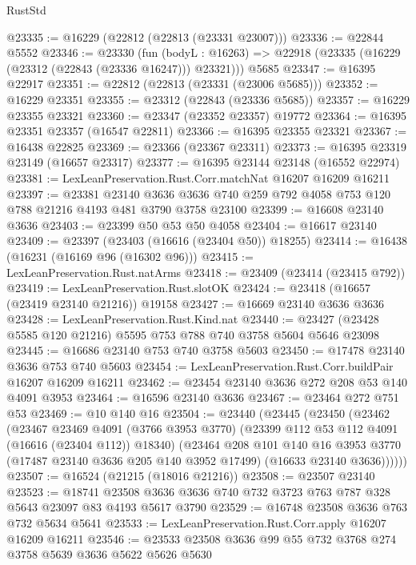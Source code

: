 \begin{lexlean}{RustStd}
\begin{coremodule}
@23335 := @16229 (@22812 (@22813 (@23331 @23007)))
@23336 := @22844 @5552
@23346 := @23330
    (fun (bodyL : @16263) => @22918 (@23335 (@16229 (@23312 (@22843 (@23336 @16247))) @23321)))
    @5685
@23347 := @16395 @22917
@23351 := @22812 (@22813 (@23331 (@23006 @5685)))
@23352 := @16229 @23351
@23355 := @23312 (@22843 (@23336 @5685))
@23357 := @16229 @23355 @23321
@23360 := @23347 (@23352 @23357) @19772
@23364 := @16395 @23351 @23357 (@16547 @22811)
@23366 := @16395 @23355 @23321
@23367 := @16438 @22825
@23369 := @23366 (@23367 @23311)
@23373 := @16395 @23319 @23149 (@16657 @23317)
@23377 := @16395 @23144 @23148 (@16552 @22974)
@23381 := LexLeanPreservation.Rust.Corr.matchNat @16207 @16209 @16211
@23397 := @23381
    @23140
    @3636
    @3636
    @740
    @259
    @792
    @4058
    @753
    @120
    @788
    @21216
    @4193
    @481
    @3790
    @3758
    @23100
@23399 := @16608 @23140 @3636
@23403 := @23399 @50 @53 @50 @4058
@23404 := @16617 @23140
@23409 := @23397 (@23403 (@16616 (@23404 @50)) @18255)
@23414 := @16438 (@16231 (@16169 @96 (@16302 @96)))
@23415 := LexLeanPreservation.Rust.natArms
@23418 := @23409 (@23414 (@23415 @792))
@23419 := LexLeanPreservation.Rust.slotOK
@23424 := @23418 (@16657 (@23419 @23140 @21216)) @19158
@23427 := @16669 @23140 @3636 @3636
@23428 := LexLeanPreservation.Rust.Kind.nat
@23440 := @23427 (@23428 @5585 @120 @21216) @5595 @753 @788 @740 @3758 @5604 @5646 @23098
@23445 := @16686 @23140 @753 @740 @3758 @5603
@23450 := @17478 @23140 @3636 @753 @740 @5603
@23454 := LexLeanPreservation.Rust.Corr.buildPair @16207 @16209 @16211
@23462 := @23454 @23140 @3636 @272 @208 @53 @140 @4091 @3953
@23464 := @16596 @23140 @3636
@23467 := @23464 @272 @751 @53
@23469 := @10 @140 @16
@23504 := @23440
    (@23445
      (@23450
        (@23462
          (@23467
            @23469
            @4091
            (@3766 @3953 @3770)
            (@23399 @112 @53 @112 @4091 (@16616 (@23404 @112)) @18340)
            (@23464
              @208
              @101
              @140
              @16
              @3953
              @3770
              (@17487 @23140 @3636 @205 @140 @3952 @17499)
              (@16633 @23140 @3636))))))
@23507 := @16524 (@21215 (@18016 @21216))
@23508 := @23507 @23140
@23523 := @18741
    @23508
    @3636
    @3636
    @740
    @732
    @3723
    @763
    @787
    @328
    @5643
    @23097
    @83
    @4193
    @5617
    @3790
@23529 := @16748 @23508 @3636 @763 @732 @5634 @5641
@23533 := LexLeanPreservation.Rust.Corr.apply @16207 @16209 @16211
@23546 := @23533 @23508 @3636 @99 @55 @732 @3768 @274 @3758 @5639 @3636 @5622 @5626 @5630

\end{coremodule}
\end{lexlean}
